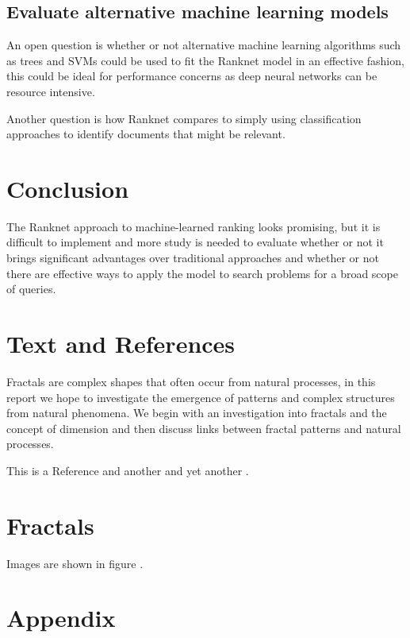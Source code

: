 \documentclass[a4paper,11pt,twoside]{article}
\begin{document}
\subsection{Evaluate alternative machine learning models}
\label{sec:org5a26788}
An open question is whether or not alternative machine learning
algorithms such as trees and SVMs could be used to fit the Ranknet
model in an effective fashion, this could be ideal for performance
concerns as deep neural networks can be resource intensive.

Another question is how Ranknet compares to simply using
classification approaches to identify documents that might be
relevant.  


\section{Conclusion}
\label{sec:orgb7e7e08}
The Ranknet approach to machine-learned ranking looks promising, but
it is difficult to implement and more study is needed to evaluate
whether or not it brings significant advantages over traditional
approaches and whether or not there are effective ways to apply the
model to search problems for a broad scope of queries.


\section{Text and References}
\label{sec:orgdee20e0}
Fractals are complex shapes that often occur from natural processes, in this
report we hope to investigate the emergence of patterns and complex structures
from natural phenomena. We begin with an investigation into fractals and the
concept of dimension and then discuss links between fractal patterns and natural
processes.

This is a Reference \cite{tuGraphBasedSemiSupervisedNearestNeighbor2016a} and another \cite{nicodemiIntroductionAbstractAlgebra2007a} and yet another \cite{christopherburgesRankNetLambdaRankLambdaMART2010}.

\section{Fractals}
\label{sec:org864192c}
Images are shown in figure .

\section{Appendix}
\label{sec:orgb08ea89}
\end{document}
